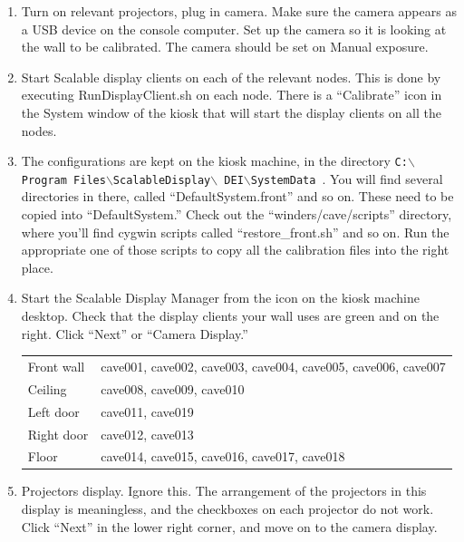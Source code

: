 \documentclass[11pt]{article}
\begin{document}
\begin{enumerate}

\item Turn on relevant projectors, plug in camera.  Make sure the camera
  appears as a USB device on the console computer.  Set up the camera
  so it is looking at the wall to be calibrated.  The camera should be
  set on Manual exposure.

\item Start Scalable display clients on each of the relevant nodes.
  This is done by executing RunDisplayClient.sh on each node.  There
  is a ``Calibrate'' icon in the System window of the kiosk that
  will start the display clients on all the nodes.

\newcommand{\bs}{$\backslash$}
\item The configurations are kept on the kiosk machine, in the
  directory \hbox{\texttt{C:\bs Program Files\bs ScalableDisplay\bs
      DEI\bs SystemData }}.  You will find several directories in
  there, called ``DefaultSystem.front'' and so on.  These need to be
  copied into ``DefaultSystem.''  Check out the
  ``winders/cave/scripts'' directory, where you'll find cygwin scripts
  called ``restore\_front.sh'' and so on.  Run the appropriate one of
  those scripts to copy all the calibration files into the right place.

\item Start the Scalable Display Manager from the icon on the kiosk
  machine desktop.  Check that the display clients your wall uses are
  green and on the right. Click ``Next'' or ``Camera Display.''

  \begin{center}
  \begin{tabular}{ll}
    Front wall & cave001, cave002, cave003, cave004, cave005, cave006,
                 cave007 \\
    Ceiling & cave008, cave009, cave010 \\
    Left door & cave011, cave019 \\
    Right door & cave012, cave013 \\
    Floor & cave014, cave015, cave016, cave017, cave018 \\ 
  \end{tabular}
\end{center}


\item Projectors display.  Ignore this.  The arrangement of the
  projectors in this display is meaningless, and the checkboxes on
  each projector do not work.  Click ``Next'' in the lower right
  corner, and move on to the camera display.


\end{enumerate}
\end{document}
